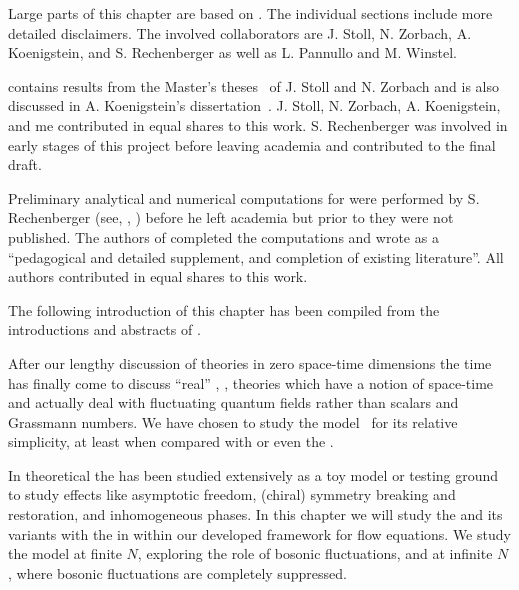 \begin{disclaimer}
	Large parts of this chapter are based on . The individual sections include more detailed disclaimers. The involved collaborators are J. Stoll, N. Zorbach, A. Koenigstein, and S. Rechenberger as well as L. Pannullo and M. Winstel.
	
	 contains results from the Master's theses~\cite{Stoll:2021thesis,Zorbach:2021thesis} of J. Stoll and N. Zorbach and is also discussed in A. Koenigstein's dissertation~\cite{Koenigstein:2022phd}. J. Stoll, N. Zorbach, A. Koenigstein, and me contributed in equal shares to this work. S. Rechenberger was involved in early stages of this project before leaving academia and contributed to the final draft.
	
	 Preliminary analytical and numerical computations for  were performed by S. Rechenberger (see, \eg{}, ) before he left academia but prior to  they were not published. The authors of  completed the computations and wrote  as a ``pedagogical and detailed supplement, and completion of existing literature''. All authors contributed in equal shares to this work.
	
	The following introduction of this chapter has been compiled from the introductions and abstracts of .
\end{disclaimer}
After our lengthy discussion of theories in zero space-time dimensions the time has finally come to discuss ``real'' \qft{}, \ie{}, theories which have a notion of space-time and actually deal with fluctuating quantum fields rather than scalars and Grassmann numbers. We have chosen to study the \twoDimensional{}  model~\cite{Gross:1974jv} for its relative simplicity, at least when compared with \qcd{} or even the \qmm{}.

In theoretical \hep{} the \gnm{} has been studied extensively as a toy model or testing ground to study effects like asymptotic freedom, (chiral) symmetry breaking and restoration, and inhomogeneous phases.
In this chapter we will study the \gnm{} and its variants with the \frg{} in \lpa{} within our developed \cfd{} framework for \frg{} flow equations. 
We study the model at finite $N$, exploring the role of bosonic fluctuations, and at infinite $N$, where bosonic fluctuations are completely suppressed.\bigskip

